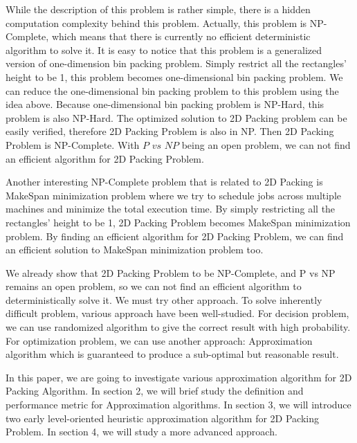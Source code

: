 \documentclass[sigplan,screen,nonacm]{acmart}\settopmatter{printfolios=true,printccs=false,printacmref=false}
\begin{document}
While the description of this problem is rather simple, there is a hidden computation complexity behind this problem. Actually, this problem is NP-Complete\cite{hartmanis1982computers}, which means that there is currently no efficient deterministic algorithm to solve it. It is easy to notice that this problem is a generalized version of one-dimension bin packing problem\cite{johnson1974worst}. Simply restrict all the rectangles' height to be 1, this problem becomes one-dimensional bin packing problem. We can reduce the one-dimensional bin packing problem to this problem using the idea above. Because one-dimensional bin packing problem is NP-Hard, this problem is also NP-Hard. The optimized solution to 2D Packing problem can be easily verified, therefore 2D Packing Problem is also in NP. Then 2D Packing Problem is NP-Complete. With $P$ $vs$ $NP$ being an open problem, we can not find an efficient algorithm for 2D Packing Problem. \par
Another interesting NP-Complete problem that is related to 2D Packing is MakeSpan minimization problem\cite{graham1966bounds} where we try to schedule jobs across multiple machines and minimize the total execution time. By simply restricting all the rectangles' height to be 1, 2D Packing Problem becomes MakeSpan minimization problem. By finding an efficient algorithm for 2D Packing Problem, we can find an efficient solution to MakeSpan minimization problem too. \par
We already show that 2D Packing Problem to be NP-Complete, and P vs NP remains an open problem, so we can not find an efficient algorithm to deterministically solve it. We must try other approach. To solve inherently difficult problem, various approach have been well-studied. For decision problem, we can use randomized algorithm to give the correct result with high probability. For optimization problem, we can use another approach: Approximation algorithm\cite{garey1976approximation} which is guaranteed to produce a sub-optimal but reasonable result. \par
In this paper, we are going to investigate various approximation algorithm for 2D Packing Algorithm. In section 2, we will brief study the definition and performance metric for Approximation algorithms. In section 3, we will introduce two early level-oriented heuristic approximation algorithm\cite{coffman1980performance} for 2D Packing Problem. In section 4,  we will study a more advanced approach\cite{steinberg1997strip}.
\end{document}

